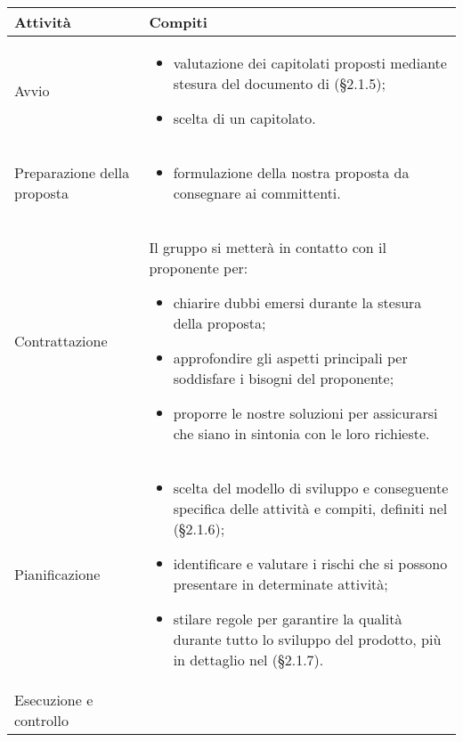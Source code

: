 \setcounter{table}{-1}
{


\centering
\renewcommand{\arraystretch}{1.5}
\begin{longtable}{C{4cm} C{11cm}}
\textbf{Attività} &
\textbf{Compiti}\\
\endhead

Avvio & \vspace{-0.5cm}
	\begin{itemize}
		\item valutazione dei capitolati proposti mediante stesura del documento di \SdFv{}(§2.1.5);
		\item scelta di un capitolato.
	\end{itemize}  \\
Preparazione della proposta & \vspace{-0.5cm}
	\begin{itemize}
		\item formulazione della nostra proposta da consegnare ai committenti.
	\end{itemize}  \\
Contrattazione & Il gruppo si metterà in contatto con il proponente per: 
	\begin{itemize}
		\item chiarire dubbi emersi durante la stesura della proposta;
		\item approfondire gli aspetti principali per soddisfare i bisogni del proponente;
		\item proporre le nostre soluzioni per assicurarsi che siano in sintonia con le loro richieste.
	\end{itemize}  \\
Pianificazione & \vspace{-0.5cm}
	\begin{itemize}
		\item scelta del modello di sviluppo e conseguente specifica delle attività e compiti, definiti nel \PdPv{}(§2.1.6);
		\item identificare e valutare i rischi che si possono presentare in determinate attività;
		\item stilare regole per garantire la qualità durante tutto lo sviluppo del prodotto, più in dettaglio nel \PdQv{}(§2.1.7).
	\end{itemize}  \\
Esecuzione e controllo & \vspace{-0.5cm}
	\begin{itemize}

\end{itemize}
\end{longtable}}
